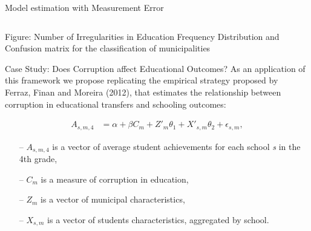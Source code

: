\documentclass[handout,t,usenames,dvipsnames]{beamer}
\begin{document}
\begin{frame}{Model estimation with Measurement Error}
\begin{itemize}
\begin{columns}
\begin{column}{0.5\textwidth}
\begin{center}
     \end{center}
\end{column}
\end{columns}
\caption{\footnotesize{{\color{emap-azul-escuro}Figure:} Number of Irregularities in Education Frequency Distribution and Confusion matrix for the classification of municipalities}}
\end{itemize}
\centering

\end{frame}




\begin{frame}{Case Study: Does Corruption affect Educational Outcomes?}
\justifying
As an application of this framework we propose replicating the empirical strategy proposed by~ Ferraz, Finan and Moreira (2012)\nocite{Educacao}, that estimates the relationship between corruption in educational transfers and schooling outcomes:

\begin{align*}
    \label{eq:modelo}
        A_{s,m,4} &= \alpha + \beta C_m + Z'_m \theta_1 + X'_{s,m} \theta_2 + \epsilon_{s,m},
    \end{align*}
    
\begin{itemize}
\small
    \item [--] $A_{s,m,4}$ is a vector of average student achievements for each school \textit{s} in the 4th grade,
    \item [--] $C_m$ is a measure of corruption in education,
    \item [--] $Z_m$ is a vector of municipal characteristics,
    \item [--] $X_{s,m}$ is a vector of students characteristics, aggregated by school.
\end{itemize}
\end{frame}
\end{document}
